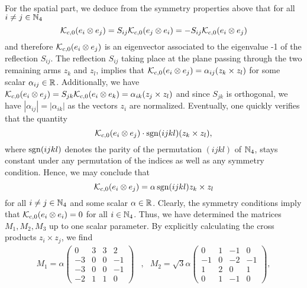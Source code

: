 For the spatial part, we deduce from the symmetry properties above that for all $i \neq j \in \mathbb{N}_4$	
\begin{equation}
	\mathcal{K}_{c,0}(e_i \otimes e_j) = S_{ij} \mathcal{K}_{c,0}(e_j \otimes e_i) = -S_{ij} \mathcal{K}_{c,0}(e_i \otimes e_j)
\end{equation}
and therefore $\mathcal{K}_{c,0}(e_i \otimes e_j)$ is an eigenvector associated to the eigenvalue -1 of the reflection $S_{ij}$. The reflection $S_{ij}$ taking place at the plane passing through the two remaining arms $z_k$ and $z_l$, implies that $\mathcal{K}_{c,0}(e_i \otimes e_j) = \alpha_{ij}( z_k \times z_l)$ for some scalar $\alpha_{ij} \in \mathbb{R}$. Additionally, we have $\mathcal{K}_{c,0}(e_i \otimes e_j) = S_{jk} \mathcal{K}_{c,0}(e_i \otimes e_k) = \alpha_{ik}(z_j \times z_l)$ and since $S_{jk}$ is orthogonal, we have $|\alpha_{ij}| = |\alpha_{ik}|$ as the vectors $z_i$ are normalized. Eventually, one quickly verifies that the quantity
\begin{equation}
	\mathcal{K}_{c,0}(e_i \otimes e_j) \cdot \operatorname{sgn}(ijkl) (z_k \times z_l),
\end{equation}
where $\operatorname{sgn}(ijkl)$ denotes the parity of the permutation $(ijkl)$ of $\mathbb{N}_4$, stays constant under any permutation of the indices as well as any symmetry condition. Hence, we may conclude that
\begin{equation}
	\mathcal{K}_{c,0}(e_i \otimes e_j) = \alpha \operatorname{sgn}(ijkl) z_k \times z_l
\end{equation}
for all $i \neq j \in \mathbb{N}_4$ and some scalar $\alpha \in \mathbb{R}$. Clearly, the symmetry conditions imply that $\mathcal{K}_{c,0}(e_i \otimes e_i) = 0$ for all $i \in  \mathbb{N}_4$. Thus, we have determined the matrices $M_1, M_2, M_3$ up to one scalar parameter. By explicitly calculating the cross products $z_i \times z_j$, we find
\renewcommand{\arraystretch}{1.1}
\begin{align}
\label{eq: M1 and M2}
M_1 = \alpha \left ( \begin{array}{cccc}
0 & 3 & 3 & 2 \\ 
-3 & 0 & 0 & -1 \\ 
-3 & 0 & 0 & -1 \\ 
-2 & 1 & 1 & 0
\end{array} \right ) &, &
M_2 = \sqrt{3} \alpha \left (
\begin{array}{cccc}
0 & 1 & -1 & 0 \\ 
-1 & 0 & -2 & -1 \\ 
1 & 2 & 0 & 1 \\ 
0 & 1 & -1 & 0
\end{array} \right),
\end{align}
